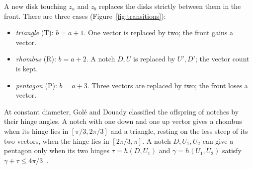 \documentclass[11pt]{amsart}
\theoremstyle{definition}
\begin{document}
A new disk touching $z_a$ and $z_b$ replaces the disks strictly between them in the front. There are
three cases (Figure~\ref{fig:transitions}):
\begin{itemize}
\item \emph{triangle} (T): $b=a+1$. One vector is replaced by two; the front gains a vector.
\item \emph{rhombus} (R): $b=a+2$. A notch $D,U$ is replaced by $U',D'$; the vector count is kept.
\item \emph{pentagon} (P): $b=a+3$. Three vectors are replaced by two; the front loses a vector.
\end{itemize}
At constant diameter, Gol\'e and Douady classified the offspring of notches by their hinge angles. A
notch with one down and one up vector gives a rhombus when its hinge lies in $[\pi/3,2\pi/3]$ and a
triangle, resting on the less steep of its two vectors, when the hinge lies in $[2\pi/3,\pi]$. A notch
$D,U_1,U_2$ can give a pentagon only when its two hinges $\tau=h(D,U_1)$ and $\gamma=h(U_1,U_2)$ satisfy
$\gamma+\tau\le4\pi/3$~\cite[Prop.~4.3]{GD}.
\end{document}
